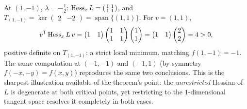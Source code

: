 \begin{example}
At $(1,-1)$, $\lambda=-\tfrac12$: $\operatorname{Hess}_xL = \left(\begin{smallmatrix}1&1\\1&1\end{smallmatrix}\right)$, and $T_{(1,-1)} = \ker\begin{pmatrix}2&-2\end{pmatrix} = \operatorname{span}\{(1,1)\}$. For $v=(1,1)$,
\[v^{\mathsf{T}}\operatorname{Hess}_xL\,v = \begin{pmatrix}1&1\end{pmatrix}\begin{pmatrix}1&1\\1&1\end{pmatrix}\begin{pmatrix}1\\1\end{pmatrix} = \begin{pmatrix}1&1\end{pmatrix}\begin{pmatrix}2\\2\end{pmatrix} = 4 > 0,\]
positive definite on $T_{(1,-1)}$: a strict local minimum, matching $f(1,-1)=-1$. The same
computation at $(-1,-1)$ and $(-1,1)$ (by symmetry $f(-x,-y)=f(x,y)$) reproduces the same two
conclusions. This is the sharpest illustration available of the theorem's point: the
\emph{unrestricted} Hessian of $L$ is degenerate at both critical points, yet restricting to the
$1$-dimensional tangent space resolves it completely in both cases.
\end{example}

